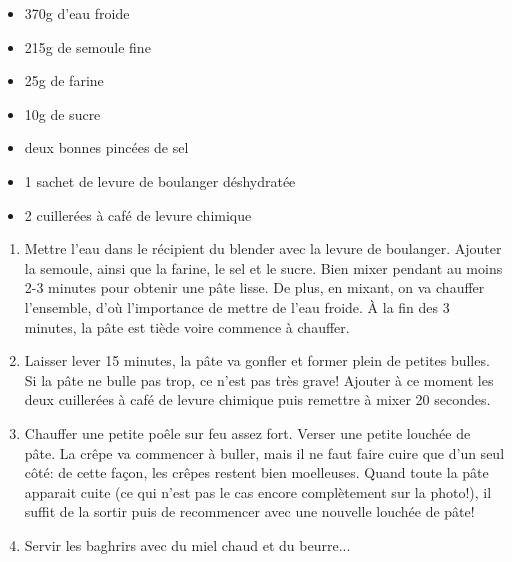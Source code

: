 \bigskip
{}
{}{\begin{itemize}
	\item 370g d'eau froide
	\item 215g de semoule fine
	\item 25g de farine
	\item 10g de sucre
	\item deux bonnes pincées de sel
	\item 1 sachet de levure de boulanger déshydratée
	\item 2 cuillerées à café de levure chimique
\end{itemize}}
{\begin{enumerate}
	\item Mettre l'eau dans le récipient du blender avec la levure de boulanger. Ajouter la semoule, ainsi que la farine, le sel et le sucre. Bien mixer pendant au moins 2-3 minutes pour obtenir une pâte lisse. De plus, en mixant, on va chauffer l'ensemble, d'où l'importance de mettre de l'eau froide. À la fin des 3 minutes, la pâte est tiède voire commence à chauffer.
	\item Laisser lever 15 minutes, la pâte va gonfler et former plein de petites bulles. Si la pâte ne bulle pas trop, ce n'est pas très grave! Ajouter à ce moment les deux cuillerées à café de levure chimique puis remettre à mixer 20 secondes.
	\item Chauffer une petite poêle sur feu assez fort. Verser une petite louchée de pâte. La crêpe va commencer à buller, mais il ne faut faire cuire que d'un seul côté: de cette façon, les crêpes restent bien moelleuses. Quand toute la pâte apparait cuite (ce qui n'est pas le cas encore complètement sur la photo!), il suffit de la sortir puis de recommencer avec une nouvelle louchée de pâte!
	\item Servir les baghrirs avec du miel chaud et du beurre... 
\end{enumerate}}

